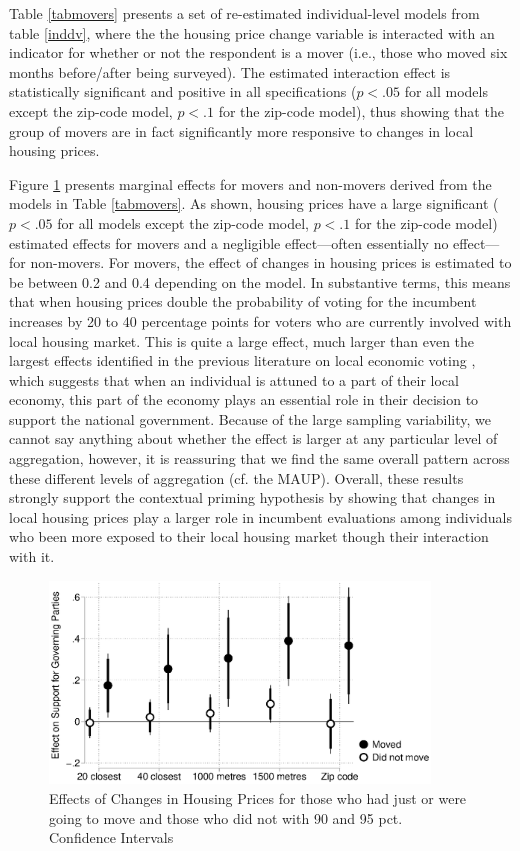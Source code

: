 \documentclass[12pt,a4paper]{article}
\begin{document}
	Table \ref{tabmovers} presents a set of re-estimated individual-level models from table \ref{inddv}, where the the housing price change variable is interacted with an indicator for whether or not the respondent is a mover (i.e., those who moved six months before/after being surveyed). The estimated interaction effect is statistically significant and positive in all specifications ($p<.05$ for all models except the zip-code model, $p<.1$ for the zip-code model), thus  showing that the group of movers are in fact significantly more responsive to changes in local housing prices. 
	
	Figure \ref{move} presents marginal effects for movers and non-movers derived from the models in Table \ref{tabmovers}. As shown, housing prices have a large significant ($p<.05$ for all models except the zip-code model, $p<.1$ for the zip-code model) estimated effects for movers and a negligible effect—often essentially no effect—for non-movers. For movers, the effect of changes in housing prices is estimated to be between 0.2 and 0.4 depending on the model. In substantive terms, this means that when housing prices double the probability of voting for the incumbent increases by 20 to 40 percentage points for voters who are currently involved with local housing market. This is quite a large effect, much larger than even the largest effects identified in the previous literature on local economic voting \citep{healy2017presidential}, which suggests that when an individual is attuned to a part of their local economy, this part of the economy plays an essential role in their decision to support the national government. Because of the large sampling variability, we cannot say anything about whether the effect is larger at any particular level of aggregation, however, it is reassuring that we find the same overall pattern across these different levels of aggregation (cf. the MAUP). 
	Overall, these results strongly support the contextual priming hypothesis by showing that changes in local housing prices play a larger role in incumbent evaluations among individuals who been more exposed to their local housing market though their interaction with it.
	
	
	
	\begin{figure}[htbp!]
		\includegraphics[width=0.9\textwidth]{../figures/moving.eps}
		\centering
		\caption{Effects of Changes in Housing Prices for those who had just or were going to move and those who did not with 90 and 95 pct. Confidence Intervals}\label{move}
	\end{figure}
	
\end{document}
